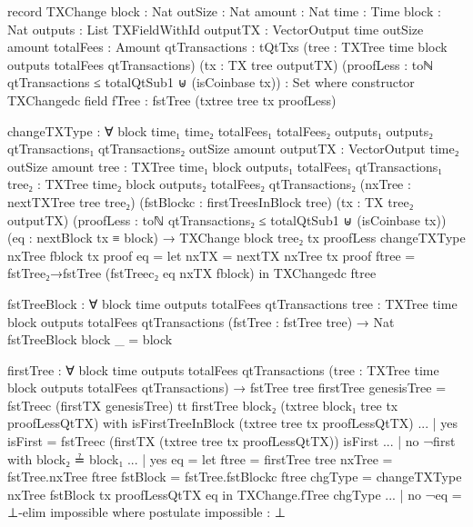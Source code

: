 \documentclass{beamer}
\begin{document}
\begin{code}
      record TXChange
        {block : Nat}
        {outSize : Nat}
        {amount : Nat}
        {time : Time}
        {block : Nat}
        {outputs : List TXFieldWithId}
        {outputTX : VectorOutput time outSize amount}
        {totalFees : Amount}
        {qtTransactions : tQtTxs}
        (tree : TXTree time block outputs totalFees qtTransactions)
        (tx : TX tree outputTX)
        (proofLess :
          toℕ qtTransactions ≤ totalQtSub1
          ⊎
          (isCoinbase tx))
        : Set where
        constructor TXChangedc
        field
          fTree                 : fstTree (txtree tree tx proofLess)


      changeTXType : ∀
        {block time₁ time₂ totalFees₁ totalFees₂ outputs₁ outputs₂ qtTransactions₁ qtTransactions₂
        outSize amount}
        {outputTX : VectorOutput time₂ outSize amount}
        {tree : TXTree time₁ block outputs₁ totalFees₁ qtTransactions₁}
        {tree₂ : TXTree time₂ block outputs₂ totalFees₂ qtTransactions₂}
        (nxTree : nextTXTree tree tree₂)
        (fstBlockc : firstTreesInBlock tree)
        (tx : TX tree₂ outputTX)
        (proofLess :
          toℕ qtTransactions₂ ≤ totalQtSub1
          ⊎
          (isCoinbase tx))
        (eq : nextBlock tx ≡ block)
        → TXChange {block} tree₂ tx proofLess
      changeTXType nxTree fblock tx proof eq =
        let nxTX = nextTX nxTree tx proof
            ftree = fstTree₂→fstTree (fstTreec₂ eq nxTX fblock)
        in TXChangedc ftree


      fstTreeBlock : ∀
        {block time outputs totalFees qtTransactions}
        {tree : TXTree time block outputs totalFees qtTransactions}
        (fstTree : fstTree tree)
        → Nat
      fstTreeBlock {block} _ = block

      firstTree : ∀
        {block time outputs totalFees qtTransactions}
        (tree : TXTree time block outputs totalFees qtTransactions)
        → fstTree tree
      firstTree genesisTree = fstTreec (firstTX genesisTree) tt
      firstTree {block₂} (txtree {block₁} tree tx proofLessQtTX)
        with isFirstTreeInBlock (txtree tree tx proofLessQtTX)
      ... | yes isFirst = fstTreec (firstTX (txtree tree tx proofLessQtTX)) isFirst
      ... | no ¬first with block₂ ≟ block₁
      ...   | yes eq = let ftree = firstTree tree
                           nxTree = fstTree.nxTree ftree
                           fstBlock = fstTree.fstBlockc ftree
                           chgType = changeTXType nxTree fstBlock tx proofLessQtTX eq
                       in TXChange.fTree chgType
      ...   | no ¬eq = ⊥-elim impossible
                where postulate impossible : ⊥


\end{code}
\end{document}
